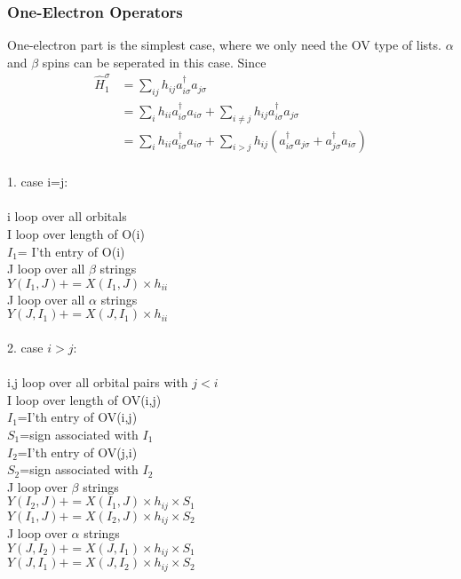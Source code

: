 \documentclass[twocolumn]{article}
\begin{document}
\subsubsection{One-Electron Operators}
One-electron part is the simplest case, where we only need the OV type of lists. $\alpha$ and $\beta$ spins can be seperated in this case. Since
\begin{equation}
  \begin{split}
    \hat{H}_1^{\sigma}&=\sum_{ij}h_{ij}a_{i\sigma}^\dagger a_{j\sigma}\\
    &=\sum_i h_{ii}a_{i\sigma}^\dagger a_{i\sigma}+\sum_{i\neq j}h_{ij}a_{i\sigma}^\dagger a_{j\sigma}\\
    &=\sum_i h_{ii}a_{i\sigma}^\dagger a_{i\sigma}+\sum_{i>j}h_{ij}(a_{i\sigma}^\dagger a_{j\sigma}+a_{j\sigma}^{\dagger}a_{i\sigma})
  \end{split}
  \label{eq:H1}
\end{equation}
\\
1. case i=j:\\
\\
i loop over all orbitals\\
\indent I loop over length of O(i)\\
\indent\indent $I_1$= I'th entry of O(i)\\
\indent\indent J loop over all $\beta$ strings\\
\indent\indent\indent\indent $Y(I_1,J)+=X(I_1,J)\times h_{ii}$\\
\indent\indent J loop over all $\alpha$ strings\\
\indent\indent\indent\indent $Y(J,I_1)+=X(J,I_1)\times h_{ii}$\\
\\
2. case $i>j$:\\
\\
i,j loop over all orbital pairs with $j<i$\\
\indent I loop over length of OV(i,j)\\
\indent\indent $I_1$=I'th entry of OV(i,j)\\
\indent\indent $S_1$=sign associated with $I_1$\\
\indent\indent $I_2$=I'th entry of OV(j,i)\\
\indent\indent $S_2$=sign associated with $I_2$\\
\indent\indent J loop over $\beta$ strings\\
\indent\indent\indent $Y(I_2,J)+=X(I_1,J)\times h_{ij}\times S_1$\\
\indent\indent\indent $Y(I_1,J)+=X(I_2,J)\times h_{ij}\times S_2$\\
\indent\indent J loop over $\alpha$ strings\\
\indent\indent\indent $Y(J,I_2)+=X(J,I_1)\times h_{ij}\times S_1$\\
\indent\indent\indent $Y(J,I_1)+=X(J,I_2)\times h_{ij}\times S_2$\\
\end{document}
